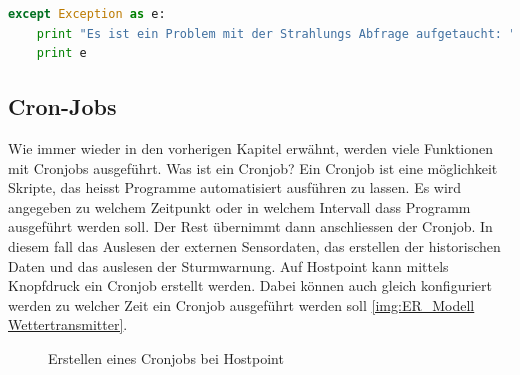 \begin{lstlisting}[label=lst:printfunction,caption=Beispiel für print Funktion, language=Python, style=py]
except Exception as e:
    print "Es ist ein Problem mit der Strahlungs Abfrage aufgetaucht: "
    print e
\end{lstlisting}

\subsection{Cron-Jobs}

Wie immer wieder in den vorherigen Kapitel erwähnt, werden viele Funktionen mit Cronjobs ausgeführt. Was ist ein Cronjob? Ein Cronjob ist eine möglichkeit Skripte, das heisst Programme automatisiert ausführen zu lassen. Es wird angegeben zu welchem Zeitpunkt oder in welchem Intervall dass Programm ausgeführt werden soll. Der Rest übernimmt dann anschliessen der Cronjob. In diesem fall das Auslesen der externen Sensordaten, das erstellen der historischen Daten und das auslesen der Sturmwarnung. Auf Hostpoint kann mittels Knopfdruck ein Cronjob erstellt werden. Dabei können auch gleich konfiguriert werden zu welcher Zeit ein Cronjob ausgeführt werden soll \ref{img:ER_Modell Wettertransmitter}.

\begin{figure}[h!]
	\centering
	\caption{Erstellen eines Cronjobs bei Hostpoint}
	\label{img:Cronjob}
\end{figure}
\newline

